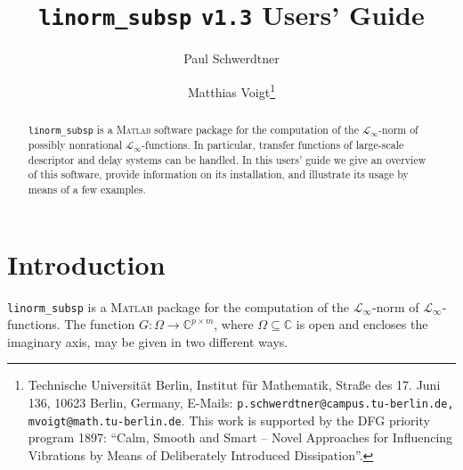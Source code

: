 \documentclass[10pt,a4paper]{article}
\author{Paul Schwerdtner \and Matthias Voigt\thanks{Technische Universit\"at Berlin, Institut f\"ur Mathematik, Stra{\ss}e des 17. Juni 136, 10623 Berlin, Germany, \newline E-Mails: \texttt{p.schwerdtner@campus.tu-berlin.de, mvoigt@math.tu-berlin.de}. \newline This work is supported by the DFG priority program 1897: ``Calm, Smooth and Smart -- Novel Approaches for Influencing Vibrations by Means of Deliberately Introduced Dissipation''.}}
\title{\texttt{linorm\_subsp} \texttt{v1.3} Users' Guide}
\begin{document}
\maketitle
\begin{abstract}
\texttt{linorm\_subsp} is a \textsc{Matlab} software package for the computation of the $\mathcal{L}_\infty$-norm of possibly nonrational $\mathcal{L}_\infty$-functions. In particular, transfer functions of large-scale descriptor and delay systems can be handled. In this users' guide we give an overview of this software, provide information on its installation, and illustrate its usage by means of a few examples.
\end{abstract}

\section{Introduction}
\texttt{linorm\_subsp} is a \textsc{Matlab} package for the computation of the $\mathcal{L}_\infty$-norm of $\mathcal{L}_\infty$-functions. The function $G: \Omega  \rightarrow \mathbb{C}^{p \times m}$, where $\Omega \subseteq \mathbb{C}$ is open and encloses the imaginary axis, may be given in two different ways.
\end{document}
